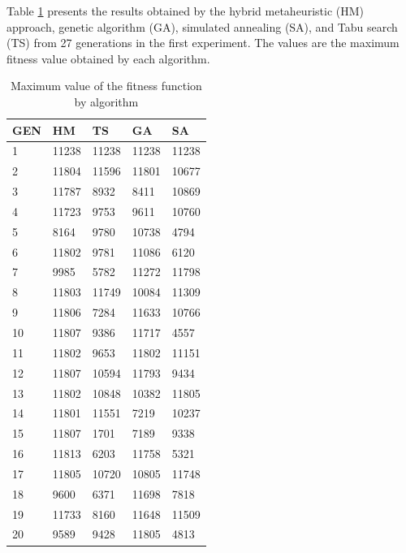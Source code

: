 Table \ref{tab:averagefirst} presents the results obtained by the hybrid metaheuristic (HM) approach, genetic algorithm (GA), simulated annealing (SA), and Tabu search (TS) from 27 generations in the first experiment. The values are the maximum fitness value obtained by each algorithm. 

\begin{table}[h]
\centering
\caption{Maximum value of the fitness function by algorithm}
\label{tab:averagefirst}
\begin{tabular}{|l|l|l|l|l|}
\hline
GEN & HM & TS  & GA    & SA    \\ \hline
1          & 11238 & 11238         & 11238 & 11238 \\ \hline
2          & 11804 & 11596         & 11801 & 10677 \\ \hline
3          & 11787 & 8932          & 8411  & 10869 \\ \hline
4          & 11723 & 9753          & 9611  & 10760 \\ \hline
5          & 8164  & 9780          & 10738 & 4794  \\ \hline
6          & 11802 & 9781          & 11086 & 6120  \\ \hline
7          & 9985  & 5782          & 11272 & 11798 \\ \hline
8          & 11803 & 11749         & 10084 & 11309 \\ \hline
9          & 11806 & 7284          & 11633 & 10766 \\ \hline
10         & 11807 & 9386          & 11717 & 4557  \\ \hline
11         & 11802 & 9653          & 11802 & 11151 \\ \hline
12         & 11807 & 10594         & 11793 & 9434  \\ \hline
13         & 11802 & 10848         & 10382 & 11805 \\ \hline
14         & 11801 & 11551         & 7219  & 10237 \\ \hline
15         & 11807 & 1701          & 7189  & 9338  \\ \hline
16         & 11813 & 6203          & 11758 & 5321  \\ \hline
17         & 11805 & 10720         & 10805 & 11748 \\ \hline
18         & 9600  & 6371          & 11698 & 7818  \\ \hline
19         & 11733 & 8160          & 11648 & 11509 \\ \hline
20         & 9589  & 9428          & 11805 & 4813  \\ \hline

\end{tabular}
\end{table}
